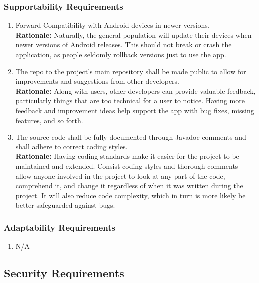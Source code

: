\documentclass[]{article}
\begin{document}
\subsubsection{Supportability Requirements}
\label{ssub:supportability_requirements}
\begin{enumerate}[{MS-S}1. ]
	\item Forward Compatibility with Android devices in newer versions.\\
	{\bf Rationale:} Naturally, the general population will update their devices when newer versions of Android releases. This should not break or crash the application, as people seldomly rollback versions just to use the app.
	\item The repo to the project's main repository shall be made public to allow for improvements and suggestions from other developers.\\
	{\bf Rationale:} Along with users, other developers can provide valuable feedback, particularly things that are too technical for a user to notice. Having more feedback and improvement ideas help support the app with bug fixes, missing features, and so forth.
	\item The source code shall be fully documented through Javadoc comments and shall adhere to correct coding styles.\\
	{\bf Rationale:} Having coding standards make it easier for the project to be maintained and extended. Consist coding styles and thorough comments allow anyone involved in the project to look at any part of the code, comprehend it, and change it regardless of when it was written during the project. It will also reduce code complexity, which in turn is more likely be better safeguarded against bugs.
\end{enumerate}

\subsubsection{Adaptability Requirements}
\label{ssub:adaptability_requirements}
\begin{enumerate}[{MS-A}1. ]
	\item N/A
\end{enumerate}


\subsection{Security Requirements}
\label{sub:security_requirements}
\end{document}
